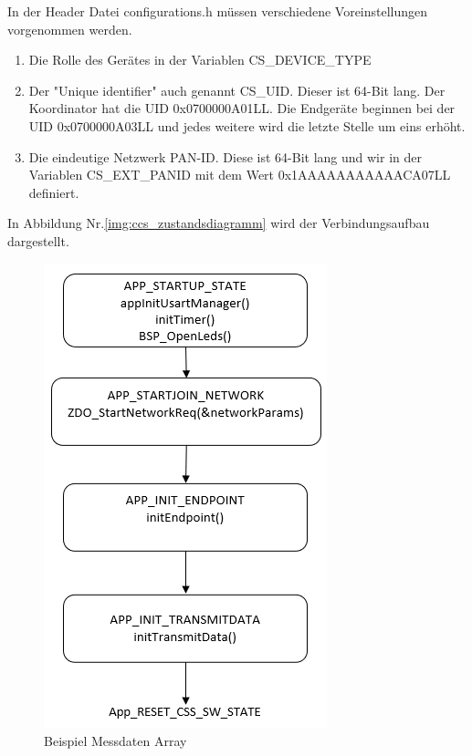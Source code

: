 \documentclass[]{article}
\begin{document}
			In der Header Datei configurations.h müssen verschiedene Voreinstellungen vorgenommen werden. 
			
			\begin{enumerate}
				\item Die Rolle des Gerätes in der Variablen CS\_DEVICE\_TYPE
				\item Der "Unique identifier" auch genannt CS\_UID. Dieser ist 64-Bit lang. Der Koordinator hat die UID 0x0700000A01LL.
				Die Endgeräte beginnen bei der UID 0x0700000A03LL und jedes weitere wird die letzte Stelle um eins erhöht.
				
				\item Die eindeutige Netzwerk PAN-ID. Diese ist 64-Bit lang und wir in der Variablen CS\_EXT\_PANID mit dem Wert 0x1AAAAAAAAAAACA07LL definiert.
			\end{enumerate}
			
			
			In Abbildung Nr.\ref{img:ccs_zustandsdiagramm} wird der Verbindungsaufbau dargestellt.
			
			\begin{figure}[!h]
				\centering
				\includegraphics[scale=0.80]{images/Netzwerkaufbau}
				\caption{Beispiel Messdaten Array}
				\label{img:Netzwerkaufbau}
			\end{figure}
			
\end{document}
